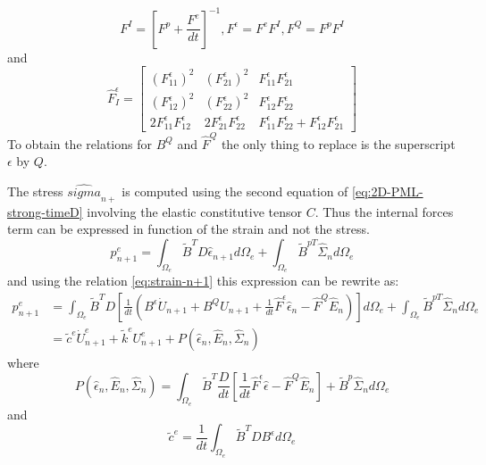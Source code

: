 \begin{equation}
F^I = \left[ F^p+\frac{F^e}{dt} \right]^{-1}, F^\epsilon = F^eF^I, F^Q=F^pF^I
\end{equation}
and
\begin{equation}
\hat{F}^\epsilon_I = \begin{bmatrix}
(F^\epsilon_{11})^2&(F^\epsilon_{21})^2& F^\epsilon_{11}F^\epsilon_{21}\\
(F^\epsilon_{12})^2&(F^\epsilon_{22})^2&F^\epsilon_{12}F^\epsilon_{22}\\
2F^\epsilon_{11}F^\epsilon_{12}&2 F^\epsilon_{21}F^\epsilon_{22}& F^\epsilon_{11}F^\epsilon_{22}+F^\epsilon_{12}F^\epsilon_{21}
\end{bmatrix}
\end{equation}
To obtain the relations for $B^Q$ and $\hat{F}^Q$ the only thing to replace is the superscript $\epsilon$ by $Q$. 
\par The stress $\hat{sigma}_{n+}$ is computed using the second equation of \ref{eq:2D-PML-strong-timeD} involving the elastic constitutive tensor $C$. Thus the internal forces term can be expressed in function of the strain and not the stress.
\begin{equation}
p_{n+1}^e = \int_{\Omega_e} \tilde{B}^{T} D \hat{\epsilon}_{n+1} d\Omega_e + \int_{\Omega_e}\tilde{B}^{pT} \hat{\Sigma}_{n} d\Omega_e
\end{equation} 
and using the relation \ref{eq:strain-n+1} this expression can be rewrite as:
\begin{align}
p_{n+1}^e &= \int_{\Omega_e} \tilde{B}^{T} D \left[\frac{1}{dt}\left(B^\epsilon \dot{U}_{n+1} + B^Q U_{n+1} + \frac{1}{dt} \hat{F}^\epsilon \hat{\epsilon}_n - \hat{F}^Q \hat{E}_n\right)  \right] d\Omega_e + \int_{\Omega_e}\tilde{B}^{pT} \hat{\Sigma}_{n} d\Omega_e \\
&= \tilde{c}^e \dot{U}^e_{n+1} + \tilde{k}^e U^e_{n+1} + P(\hat{\epsilon}_n,\hat{E}_n,\hat{\Sigma}_n)
\end{align} 
where 
\begin{equation}
P(\hat{\epsilon}_n,\hat{E}_n,\hat{\Sigma}_n) = \int_{\Omega_e} \tilde{B}^T \frac{D}{dt} \left[\frac{1}{dt}\hat{F}^{\epsilon} \hat{\epsilon} - \hat{F}^Q \hat{E}_n \right] + \tilde{B}^p \hat{\Sigma}_n d\Omega_e
\label{eq:pseudo-intern}
\end{equation}
and 
\begin{equation}
\tilde{c}^{e} = \frac{1}{dt} \int_{\Omega_e} \tilde{B}^T D B^\epsilon d\Omega_e
\label{eq:2Dpml-elem-effdamp}
\end{equation}
